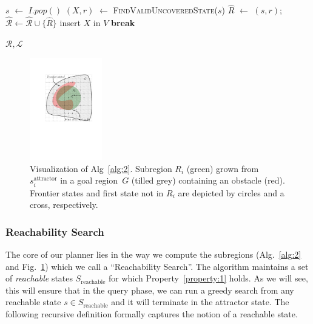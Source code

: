 \documentclass[letterpaper]{article} %
\newcommand{\calL}{\ensuremath{\mathcal{L}}\xspace}
\newcommand{\calR}{\ensuremath{\mathcal{R}}\xspace}
\newcommand{\sAttract}{\ensuremath{s^{\text{attractor}}_i}\xspace}
\begin{document}
\begin{algorithm}[t]
\begin{algorithmic}[1]
\vspace{2mm}        
        
         \label{alg:1:iv_loop}
            \State $s$ $\leftarrow$ $I.pop()$
			\If {$\nexists R \in \calR \cup \hat{\calR}$ s.t. $s \in R$ }      
\State $(X, r)$ $\leftarrow$ \textsc{FindValidUncoveredState}($s$)
                \State $\hat{R}$ $\leftarrow$ $(s,r)$;
				\hspace{2mm}
				$\hat{\calR} \leftarrow \hat{\calR} \cup \{ \hat{R} \}$   \label{alg:1:iv_region}
                    \label{alg:1:x_states}
                    \State insert $X$ in $V$
                    \State \textbf{break} \label{alg:1:break}
                \EndIf
            \EndIf
        \EndWhile
    \EndWhile

  \vspace{2mm}

  \State \Return $\calR, \calL$
\EndProcedure
\end{algorithmic}
\end{algorithm}

\begin{figure}[tb]
  \centering
  	\includegraphics[width=0.28\textwidth]{Alg2.pdf}
  \caption{
  Visualization of Alg~\ref{alg:2}. Subregion $R_i$ (green) grown from $\sAttract$ in a goal region~$G$ (tilled grey) containing an obstacle (red).
  Frontier states  and first state not in $R_i$ are depicted by circles and a cross, respectively.
}
   	\label{fig:alg2}
\end{figure}

\subsubsection{Reachability Search}
The core of our planner lies in the way we compute the subregions (Alg.~\ref{alg:2} and Fig.~\ref{fig:alg2}) which we call a ``Reachability Search''. The algorithm maintains a set of \emph{reachable} states $S_{\text{reachable}}$ for which Property~\ref{property:1} holds.
As we will see, this will ensure that in the query phase, we can run a greedy search from any reachable state $s \in S_{\text{reachable}}$ and it will terminate in the attractor state. 
%
The following recursive definition formally captures the notion of a reachable state.
\end{document}
